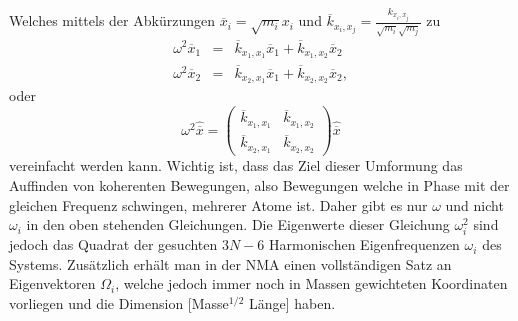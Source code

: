 \documentclass[a4paper,12pt]{article}
\begin{document}
Welches mittels der Abkürzungen $\overline{x}_i=\sqrt{m_i}x_i$ und $\overline{k}_{x_i,x_j}=\frac{{k}_{x_i,x_j}}{\sqrt{m_i}\sqrt{m_j}}$
zu
\begin{eqnarray}
 \omega^2 \overline{x}_1 &=& \overline{k}_{x_1,x_1} \overline{x}_1 +\overline{k}_{x_1,x_2} \overline{x}_2\\
 \omega^2 \overline{x}_2 &=& \overline{k}_{x_2,x_1} \overline{x}_1 +\overline{k}_{x_2,x_2} \overline{x}_2,
\end{eqnarray}
oder
\begin{equation}
 \omega^2 
 \hat{\overline{x}} = 
 \begin{pmatrix}
  \overline{k}_{x_1,x_1} &\overline{k}_{x_1,x_2}\\
  \overline{k}_{x_2,x_1} &\overline{k}_{x_2,x_2}
 \end{pmatrix}
 \hat{\overline{x}}
\end{equation}
vereinfacht werden kann. Wichtig ist, dass das Ziel dieser Umformung das Auffinden von koherenten Bewegungen, also Bewegungen welche in
Phase mit der gleichen Frequenz schwingen, mehrerer Atome ist. Daher gibt es nur $\omega$ und nicht $\omega_i$ in den oben stehenden
Gleichungen. Die Eigenwerte dieser Gleichung $\omega_i^2$ sind jedoch das Quadrat der gesuchten $3N-6$ Harmonischen 
Eigenfrequenzen $\omega_i$ des Systems. Zusätzlich erhält man in der NMA einen vollständigen Satz an Eigenvektoren $\Omega_i$, 
welche jedoch immer noch in Massen gewichteten Koordinaten vorliegen und die Dimension [Masse$^{1/2}$ Länge] haben.
\end{document}
